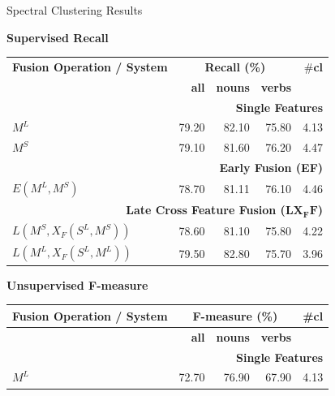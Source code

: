 \documentclass[10pt,=table]{beamer}
\newcommand\mlex{M^{\scriptscriptstyle L}}
\newcommand\msyn{M^{\scriptscriptstyle S}}
\newcommand\slex{S^{\scriptscriptstyle L}}
\begin{document}
\begin{frame}{Spectral Clustering Results}
	\vspace{.3cm}
	\begin{overprint}
			\centering \large \textbf{Supervised Recall}
			\normalsize
			
			\begin{minipage}[c][.8\textheight][c]{\linewidth}
				\centering
				\begin{tabular}{@{}lrrrr@{}}
				\toprule
				\textbf{Fusion Operation / System} & \multicolumn{3}{c}{\textbf{Recall (\%)}} & \#\textbf{cl}\\ 
				  & \textbf{all}          & \textbf{nouns}          & \textbf{verbs} &          \\ 
				  \midrule
				  \multicolumn{5}{r}{\textbf{Single Features}} \\ %
		          \rowcolor{orangeEric!70} 
				  $\mlex$ &	79.20 & 82.10 & 75.80 & 4.13\\
				  $\msyn$ & 79.10 & 81.60 & 76.20 & 4.47\\
				  \midrule
				  \multicolumn{5}{r}{\textbf{Early Fusion (EF)}} \\ 
				         $E(\mlex, \msyn)$		& 78.70 & 81.11 & 76.10 & 4.46\\
				  \midrule
				  \midrule
			   	  \multicolumn{5}{r}{\textbf{Late Cross Feature Fusion ($\mathbf{LX_FF}$)}}       \\ %
				  $L(\msyn, X_F(\slex, \msyn))$		& 78.60 & 81.10 & 75.80 & 4.22\\
		  		  \rowcolor{greenEric!70} 	   
				  $L(\mlex, X_F(\slex, \mlex))$		& {79.50} & {82.80} & 75.70 & 3.96\\	   
				  \midrule
				\end{tabular}
			\end{minipage}
		\centering \large \textbf{Unsupervised F-measure}
		\normalsize
		\begin{minipage}[c][.8\textheight][c]{\linewidth}
			\centering
			\begin{tabular}{@{}lrrrr@{}}
			\toprule
			\textbf{Fusion Operation / System} & \multicolumn{3}{c}{\textbf{F-measure (\%)}} & \#\textbf{cl}\\ \midrule
		    & \textbf{all}          & \textbf{nouns}          & \textbf{verbs}           \\ 
		    \midrule
		    \multicolumn{5}{r}{\textbf{Single Features}} \\ %
		       $\mlex$                    &	72.70	 & 76.90 & 67.90 & 4.13\\

\end{tabular}
\end{minipage}
\end{overprint}
\end{frame}
\end{document}
